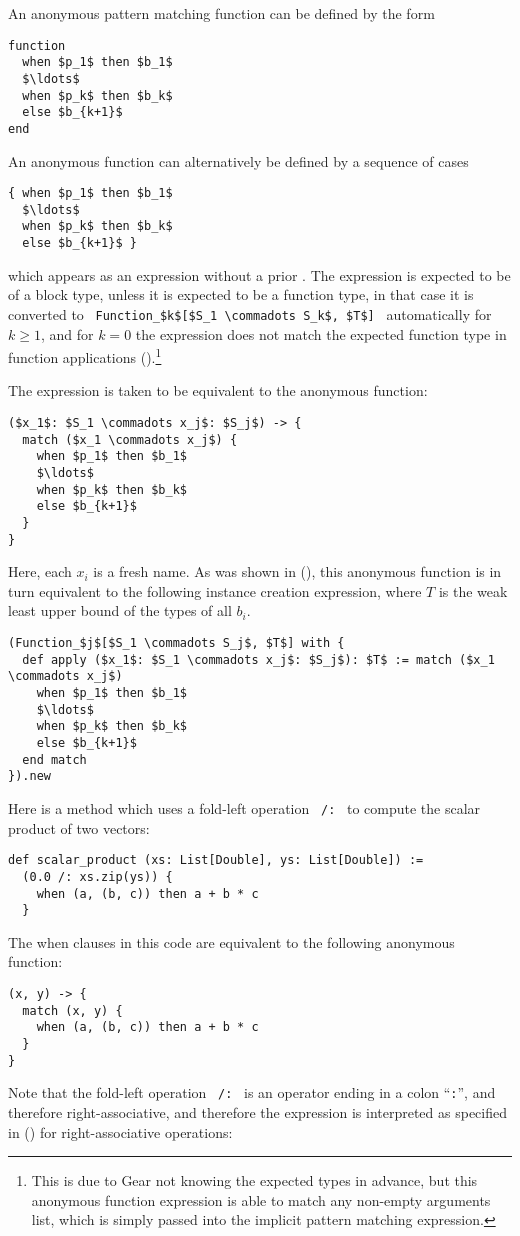 An anonymous pattern matching function can be defined by the form
\begin{lstlisting}
function 
  when $p_1$ then $b_1$ 
  $\ldots$ 
  when $p_k$ then $b_k$ 
  else $b_{k+1}$
end
\end{lstlisting}

An anonymous function can alternatively be defined by a sequence of cases
\begin{lstlisting}
{ when $p_1$ then $b_1$ 
  $\ldots$ 
  when $p_k$ then $b_k$ 
  else $b_{k+1}$ }
\end{lstlisting}
which appears as an expression without a prior . The expression is expected to be of a block type, unless it is expected to be a function type, in that case it is converted to ~\lstinline!Function_$k$[$S_1 \commadots S_k$, $T$]!~ automatically for $k \geq 1$, and for $k = 0$ the expression does not match the expected function type in function applications ().\footnote{This is due to Gear not knowing the expected types in advance, but this anonymous function expression is able to match any non-empty arguments list, which is simply passed into the implicit pattern matching expression.} 

The expression is taken to be equivalent to the anonymous function:
\begin{lstlisting}
($x_1$: $S_1 \commadots x_j$: $S_j$) -> {
  match ($x_1 \commadots x_j$) {
    when $p_1$ then $b_1$
    $\ldots$
    when $p_k$ then $b_k$
    else $b_{k+1}$
  }
}
\end{lstlisting}

Here, each $x_i$ is a fresh name. As was shown in (), this anonymous function is in turn equivalent to the following instance creation expression, where $T$ is the weak least upper bound of the types of all $b_i$. 

\begin{lstlisting}
(Function_$j$[$S_1 \commadots S_j$, $T$] with {
  def apply ($x_1$: $S_1 \commadots x_j$: $S_j$): $T$ := match ($x_1 \commadots x_j$)
    when $p_1$ then $b_1$
    $\ldots$
    when $p_k$ then $b_k$
    else $b_{k+1}$
  end match
}).new
\end{lstlisting}

\example Here is a method which uses a fold-left operation ~\lstinline!/:!~ to compute the scalar product of two vectors:
\begin{lstlisting}
def scalar_product (xs: List[Double], ys: List[Double]) := 
  (0.0 /: xs.zip(ys)) {
    when (a, (b, c)) then a + b * c
  }
\end{lstlisting}
The when clauses in this code are equivalent to the following anonymous function:
\begin{lstlisting}
(x, y) -> { 
  match (x, y) {
    when (a, (b, c)) then a + b * c
  }
}
\end{lstlisting}
Note that the fold-left operation ~\lstinline!/:!~ is an operator ending in a colon ``\lstinline!:!'', and therefore right-associative, and therefore the expression is interpreted as specified in () for right-associative operations: 

